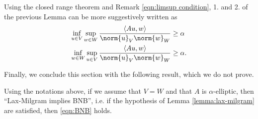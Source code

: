 \begin{remark}
    Using the closed range theorem and Remark \ref{eqn:limsup condition}, 1. and 2. of the previous Lemma can be more suggestively written as
    \begin{align}
        \inf_{u\in V}\sup_{w\in W}\frac{\langle Au,w \rangle}{\norm{u}_V\norm{w}_W}&\geq\alpha \\
        \inf_{w\in W}\sup_{u\in V}\frac{\langle Au,w \rangle}{\norm{u}_V\norm{w}_W}&\geq\alpha.
    \end{align}
\end{remark}
Finally, we conclude this section with the following result, which we do not prove.
\begin{theorem}
    Using the notations above, if we assume that $V=W$ and that $A$ is $\alpha$-elliptic, then ``Lax-Milgram implies BNB'', i.e. if the hypothesis of Lemma \ref{lemma:lax-milgram} are satisfied, then \eqref{eqn:BNB} holds.
\end{theorem}


